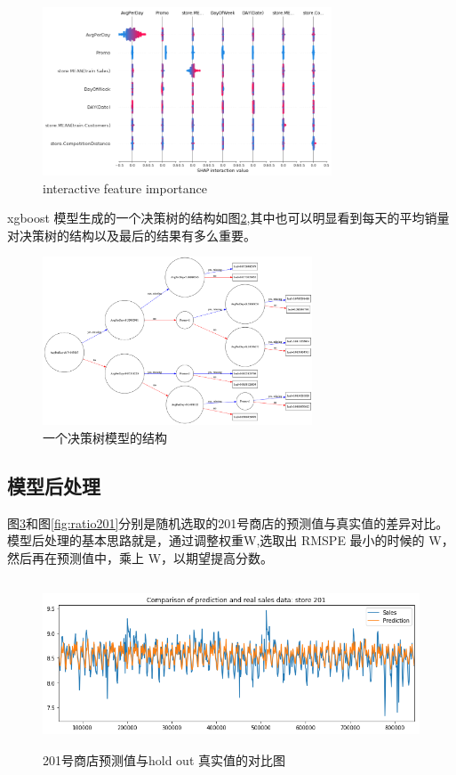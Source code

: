 \documentclass[a4paper]{article}
\begin{document}
\begin{figure}[ht]
 \centering
 \includegraphics[height=5cm,width=\textwidth]{images/shap-interactive}
 \caption{interactive feature importance}
 \label{fig:shap-interactive}
\end{figure}

xgboost 模型生成的一个决策树的结构如图\ref{fig:hor-tree},其中也可以明显看到每天的平均销量对决策树的结构以及最后的结果有多么重要。
\begin{figure}[ht]
 \centering
 \includegraphics[height=5cm,width=\textwidth]{images/hor-tree}
 \caption{一个决策树模型的结构}
 \label{fig:hor-tree}
\end{figure}
\subsection{模型后处理}
图\ref{fig:store201}和图\ref{fig:ratio201}分别是随机选取的201号商店的预测值与真实值的差异对比。模型后处理的基本思路就是，通过调整权重W,选取出 RMSPE 最小的时候的 W，然后再在预测值中，乘上 W，以期望提高分数。
\begin{figure}[ht]
 \centering
 \includegraphics[height=5cm,width=\textwidth]{images/store201}
 \caption{201号商店预测值与hold out 真实值的对比图}
 \label{fig:store201}
\end{figure}
\end{document}
